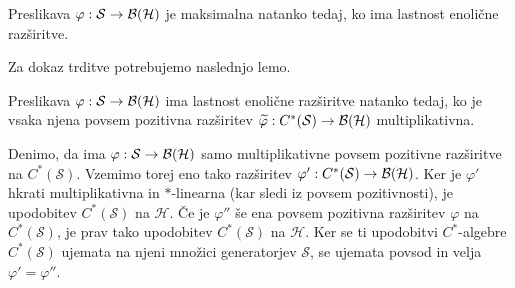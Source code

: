 \begin{trditev}\label{trd:2.1}
    Preslikava $\varphi: \mathcal{S} \to \operatorname{\mathcal{B} (\mathcal{H})}$ je maksimalna natanko tedaj, ko ima lastnost enolične razširitve.
\end{trditev}

Za dokaz trditve potrebujemo naslednjo lemo.

\begin{lema}
    Preslikava $\varphi: \mathcal{S} \to \operatorname{\mathcal{B} (\mathcal{H})}$ ima lastnost enolične razširitve natanko tedaj, ko 
    je vsaka njena povsem pozitivna razširitev $\widetilde{\varphi}: C^* (\mathcal{S}) \to \operatorname{\mathcal{B} (\mathcal{H})}$
    multiplikativna.
\end{lema}

\begin{dokaz}
    Denimo, da ima $\varphi: \mathcal{S} \to \operatorname{\mathcal{B} (\mathcal{H})}$ samo multiplikativne
    povsem pozitivne razširitve na $C^* (\mathcal{S})$. 
    Vzemimo torej eno tako razširitev $\varphi': C^* (\mathcal{S}) \to \operatorname{\mathcal{B} (\mathcal{H})}$.
    Ker je $\varphi'$ hkrati multiplikativna in $*$-linearna (kar sledi iz povsem pozitivnosti),
    je upodobitev $C^* (\mathcal{S})$ na $\mathcal{H}$.
    Če je $\varphi''$ še ena povsem pozitivna razširitev $\varphi$ na $C^* (\mathcal{S})$,
    je prav tako upodobitev $C^* (\mathcal{S})$ na $\mathcal{H}$.
    Ker se ti upodobitvi $C^*$-algebre $C^* (\mathcal{S})$ ujemata na njeni množici generatorjev $\mathcal{S}$,
    se ujemata povsod in velja $\varphi' = \varphi''$.
\end{dokaz}



